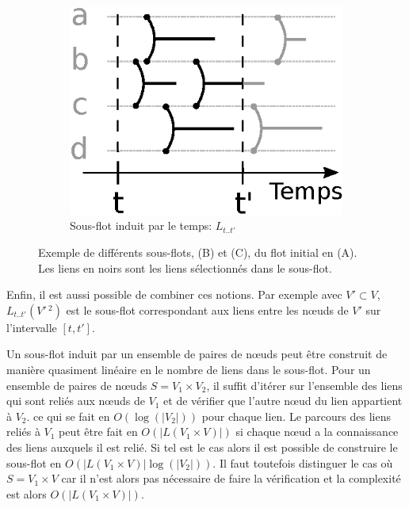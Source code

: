 \begin{figure}[]
\begin{subfigure}{0.25\linewidth}
		\includegraphics[width=\linewidth]{img/Intro/sous_flots2.eps}\hfill
		\caption{Sous-flot induit par le temps: $L_{t..t'}$}
		\label{fig:exemple_sous_flot2}	
	\end{subfigure}
	\caption{Exemple de différents sous-flots, (B) et (C), du flot initial en (A). Les liens en noirs sont les liens sélectionnés dans le sous-flot. }
\label{fig:exemple_sous_flot}
\end{figure}
Enfin, il est aussi possible de combiner ces notions.
Par exemple avec $V' \subset V$, $L_{t..t'}(V'\,^2)$ est le sous-flot correspondant aux liens entre les n\oe{}uds de $V'$ sur l'intervalle $[t, t']$.

\bigskip

Un sous-flot induit par un ensemble de paires de n\oe{}uds peut être construit de manière quasiment linéaire en le nombre de liens dans le sous-flot.
Pour un ensemble de paires de n\oe{}uds $S= V_1 \times V_2$, il suffit d'itérer sur l'ensemble des liens qui sont reliés aux n\oe{}uds de $V_1$ et de vérifier que l'autre n\oe{}ud du lien appartient à $V_2$. ce qui se fait en $O(\log(|V_2|))$ pour chaque lien.
Le parcours des liens reliés à $V_1$ peut être fait en $O(|L(V_1 \times V)|)$ si chaque n\oe{}ud a la connaissance des liens auxquels il est relié.
Si tel est le cas alors il est possible de construire le sous-flot en $O(|L(V_1\times V)|\log(|V_2|))$.
Il faut toutefois distinguer le cas où $S= V_1 \times V$ car il n'est alors pas nécessaire de faire la vérification et la complexité est alors $O(|L(V_1\times V)|)$.

